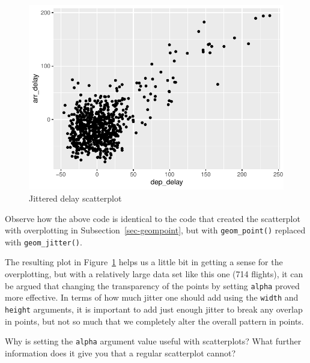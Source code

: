 \documentclass[
  letterpaper,
  DIV=11,
  numbers=noendperiod]{scrreprt}
\theoremstyle{definition}
\theoremstyle{remark}
\begin{document}
\begin{figure}[H]

{\centering \includegraphics{02-visualization_files/figure-pdf/fig-jitter-1.pdf}

}

\caption{\label{fig-jitter}Jittered delay scatterplot}

\end{figure}

Observe how the above code is identical to the code that created the
scatterplot with overplotting in Subsection~\ref{sec-geompoint}, but
with \texttt{geom\_point()} replaced with \texttt{geom\_jitter()}.

The resulting plot in Figure~\ref{fig-jitter} helps us a little bit in
getting a sense for the overplotting, but with a relatively large data
set like this one (714 flights), it can be argued that changing the
transparency of the points by setting \texttt{alpha} proved more
effective. In terms of how much jitter one should add using the
\texttt{width} and \texttt{height} arguments, it is important to add
just enough jitter to break any overlap in points, but not so much that
we completely alter the overall pattern in points.

\begin{tcolorbox}[enhanced jigsaw, colback=white, toprule=.15mm, bottomrule=.15mm, titlerule=0mm, title={{🎯} Learning Check 2.7}, leftrule=.75mm, arc=.35mm, left=2mm, colframe=quarto-callout-tip-color-frame, coltitle=black, opacitybacktitle=0.6, bottomtitle=1mm, colbacktitle=quarto-callout-tip-color!10!white, opacityback=0, toptitle=1mm, rightrule=.15mm, breakable]

Why is setting the \texttt{alpha} argument value useful with
scatterplots? What further information does it give you that a regular
scatterplot cannot?

\end{tcolorbox}
\end{document}
